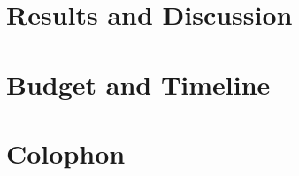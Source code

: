 %	

\chapter{Results and Discussion}
	\Mprintcontents
	\label{ch:results}
	
	\stopcontents[chapters]
	\clearpage


\printbibliography

\clearpage

\appendix
\chapter{Budget and Timeline}
	

\backmatter
\chapter{Colophon}
	



